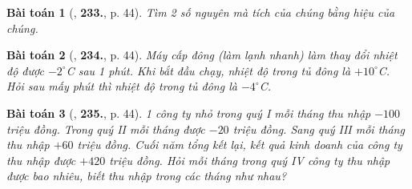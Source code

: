 \documentclass{article}
\numberwithin{equation}{section}
\newtheorem{baitoan}{Bài toán}
\begin{document}
\begin{baitoan}[\cite{Tuyen_Toan_6}, \textbf{233.}, p. 44]
	Tìm 2 số nguyên mà tích của chúng bằng hiệu của chúng.
\end{baitoan}

\begin{baitoan}[\cite{Tuyen_Toan_6}, \textbf{234.}, p. 44]
	Máy cấp đông (làm lạnh nhanh) làm thay đổi nhiệt độ được $-2^\circ$C sau 1 phút. Khi bắt đầu chạy, nhiệt độ trong tủ đông là $+10^\circ$C. Hỏi sau mấy phút thì nhiệt độ trong tủ đông là $-4^\circ$C.
\end{baitoan}

\begin{baitoan}[\cite{Tuyen_Toan_6}, \textbf{235.}, p. 44]
	1 công ty nhỏ trong quý I mỗi tháng thu nhập $-100$ triệu đồng. Trong quý II mỗi tháng được $-20$ triệu đồng. Sang quý III mỗi tháng thu nhập $+60$ triệu đồng. Cuối năm tổng kết lại, kết quả kinh doanh của công ty thu nhập được $+420$ triệu đồng. Hỏi mỗi tháng trong quý IV công ty thu nhập được bao nhiêu, biết thu nhập trong các tháng như nhau?
\end{baitoan}


\printbibliography[heading=bibintoc]
	
\end{document}
